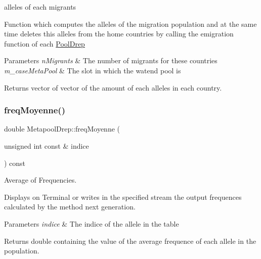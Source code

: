 alleles of each migrants 

Function which computes the alleles of the migration population and at the same time deletes this alleles from the home countries by calling the emigration function of each \hyperlink{class_pool_drep}{Pool\+Drep} 
\begin{DoxyParams}{Parameters}
{\em n\+Migrants} & The number of migrants for these countries \\
\hline
{\em m\+\_\+case\+Meta\+Pool} & The slot in which the watend pool is \\
\hline
\end{DoxyParams}
\begin{DoxyReturn}{Returns}
vector of vector of the amount of each alleles in each country. 
\end{DoxyReturn}
\hypertarget{class_metapool_drep_a8961933ec06e330a23eece772203c202}{}\label{class_metapool_drep_a8961933ec06e330a23eece772203c202} 
\subsubsection{\texorpdfstring{freq\+Moyenne()}{freqMoyenne()}}
{\footnotesize\ttfamily double Metapool\+Drep\+::freq\+Moyenne (\begin{DoxyParamCaption}\item[{unsigned int const \&}]{indice }\end{DoxyParamCaption}) const}



Average of Frequencies. 

Displays on Terminal or writes in the specified stream the output frequences calculated by the method next generation. 
\begin{DoxyParams}{Parameters}
{\em indice} & The indice of the allele in the table \\
\hline
\end{DoxyParams}
\begin{DoxyReturn}{Returns}
double containing the value of the average frequence of each allele in the population. 
\end{DoxyReturn}
\hypertarget{class_metapool_drep_a5e96dd58811d326c74eaaa6df2fd14f2}{}\label{class_metapool_drep_a5e96dd58811d326c74eaaa6df2fd14f2} 
